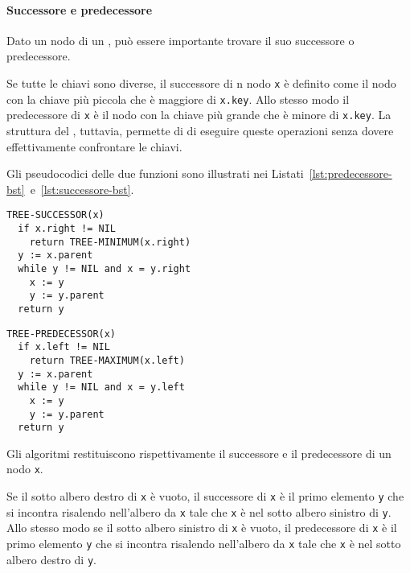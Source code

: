\documentclass[italian, 10pt]{article}
\begin{document}
\paragraph{Successore e predecessore}
\label{par:successore-predecessore-bst}

Dato un nodo di un \BST, può essere importante trovare il suo successore o predecessore.

Se tutte le chiavi sono diverse, il successore di n nodo \texttt{x} è definito come il nodo con la chiave più piccola che è maggiore di \texttt{x.key}.
Allo stesso modo il predecessore di \texttt{x} è il nodo con la chiave più grande che è minore di \texttt{x.key}.
La struttura del \BST, tuttavia, permette di di eseguire queste operazioni senza dovere effettivamente confrontare le chiavi.

Gli pseudocodici delle due funzioni sono illustrati nei Listati~\ref{lst:predecessore-bst}~e~\ref{lst:successore-bst}.

\begin{minipage}[t]{0.495\textwidth}
  \begin{lstlisting}[style=pseudocode, caption={Successore di di un nodo}, label={lst:successore-bst}]
TREE-SUCCESSOR(x)
  if x.right != NIL
    return TREE-MINIMUM(x.right)
  y := x.parent
  while y != NIL and x = y.right
    x := y
    y := y.parent
  return y
  \end{lstlisting}
\end{minipage}
\begin{minipage}[t]{0.495\textwidth}
  \begin{lstlisting}[style=pseudocode, caption={Successore di di un nodo}, label={lst:predecessore-bst}]
TREE-PREDECESSOR(x)
  if x.left != NIL
    return TREE-MAXIMUM(x.left)
  y := x.parent
  while y != NIL and x = y.left
    x := y
    y := y.parent
  return y
      \end{lstlisting}
\end{minipage}

Gli algoritmi restituiscono rispettivamente il successore e il predecessore di un nodo \texttt{x}.

\bigskip
Se il sotto albero destro di \texttt{x} è vuoto, il successore di \texttt{x} è il primo elemento \texttt{y} che si incontra risalendo nell'albero da \texttt{x} tale che \texttt{x} è nel sotto albero sinistro di \texttt{y}.
Allo stesso modo se il sotto albero sinistro di \texttt{x} è vuoto, il predecessore di \texttt{x} è il primo elemento \texttt{y} che si incontra risalendo nell'albero da \texttt{x} tale che \texttt{x} è nel sotto albero destro di \texttt{y}.
\end{document}
